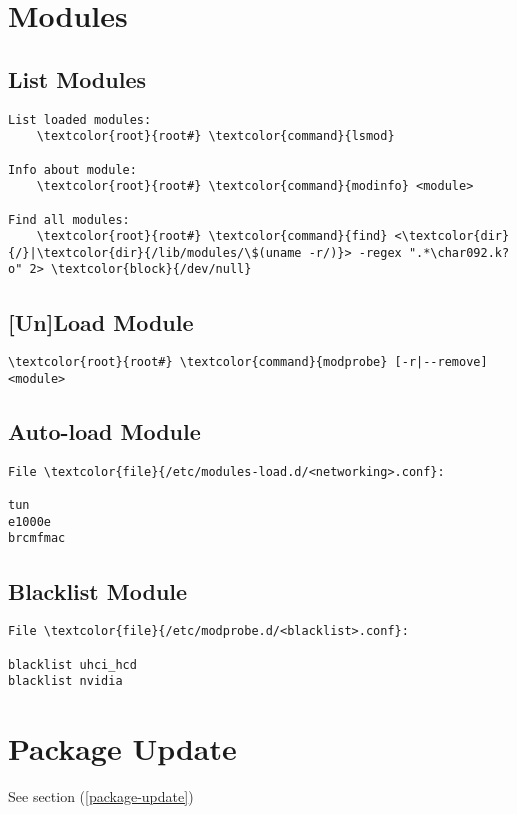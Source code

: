 \documentclass[10pt, a4paper, onecolumn, openany]{book}         %
\begin{document}
\section{Modules}
\subsection{List Modules}
\begin{Verbatim}[commandchars=\\\{\}]
List loaded modules:
    \textcolor{root}{root#} \textcolor{command}{lsmod}

Info about module:
    \textcolor{root}{root#} \textcolor{command}{modinfo} <module>
    
Find all modules:
    \textcolor{root}{root#} \textcolor{command}{find} <\textcolor{dir}{/}|\textcolor{dir}{/lib/modules/\$(uname -r/)}> -regex ".*\char092.k?o" 2> \textcolor{block}{/dev/null}
\end{Verbatim}

\subsection{[Un]Load Module}
\begin{Verbatim}[commandchars=\\\{\}]
    \textcolor{root}{root#} \textcolor{command}{modprobe} [-r|--remove] <module>
\end{Verbatim}

\subsection{Auto-load Module}
\begin{Verbatim}[commandchars=\\\{\}]
File \textcolor{file}{/etc/modules-load.d/<networking>.conf}:

tun
e1000e
brcmfmac
\end{Verbatim}
\subsection{Blacklist Module}
\begin{Verbatim}[commandchars=\\\{\}]
File \textcolor{file}{/etc/modprobe.d/<blacklist>.conf}:

blacklist uhci_hcd
blacklist nvidia
\end{Verbatim}


\section{Package Update}
See section (\underline{\ref{package-update}})
\end{document}
